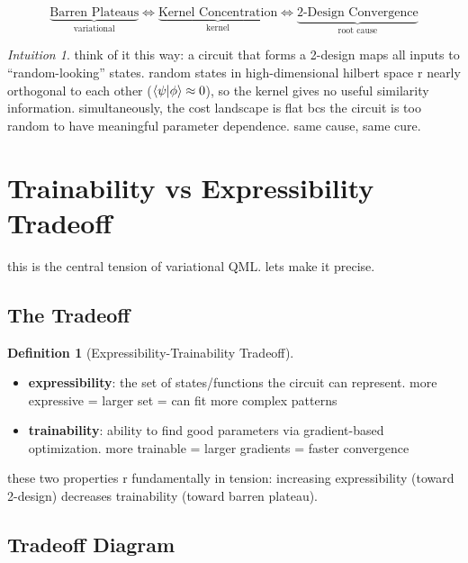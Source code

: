 \documentclass[11pt,a4paper]{article}
\theoremstyle{definition}
\newtheorem{definition}{Definition}[section]
\theoremstyle{remark}
\newtheorem*{intuition}{Intuition}
\begin{document}
\begin{equation}
    \underbrace{\text{Barren Plateaus}}_{\text{variational}} \iff \underbrace{\text{Kernel Concentration}}_{\text{kernel}} \iff \underbrace{\text{2-Design Convergence}}_{\text{root cause}}
\end{equation}

\begin{intuition}
think of it this way: a circuit that forms a 2-design maps all inputs to ``random-looking'' states. random states in high-dimensional hilbert space r nearly orthogonal to each other ($\braket{\psi|\phi} \approx 0$), so the kernel gives no useful similarity information. simultaneously, the cost landscape is flat bcs the circuit is too random to have meaningful parameter dependence. same cause, same cure.
\end{intuition}

\section{Trainability vs Expressibility Tradeoff}

this is the central tension of variational QML. lets make it precise.

\subsection{The Tradeoff}

\begin{definition}[Expressibility-Trainability Tradeoff]
\begin{itemize}
    \item \textbf{expressibility}: the set of states/functions the circuit can represent. more expressive = larger set = can fit more complex patterns
    \item \textbf{trainability}: ability to find good parameters via gradient-based optimization. more trainable = larger gradients = faster convergence
\end{itemize}
these two properties r fundamentally in tension: increasing expressibility (toward 2-design) decreases trainability (toward barren plateau).
\end{definition}

\subsection{Tradeoff Diagram}
\end{document}
